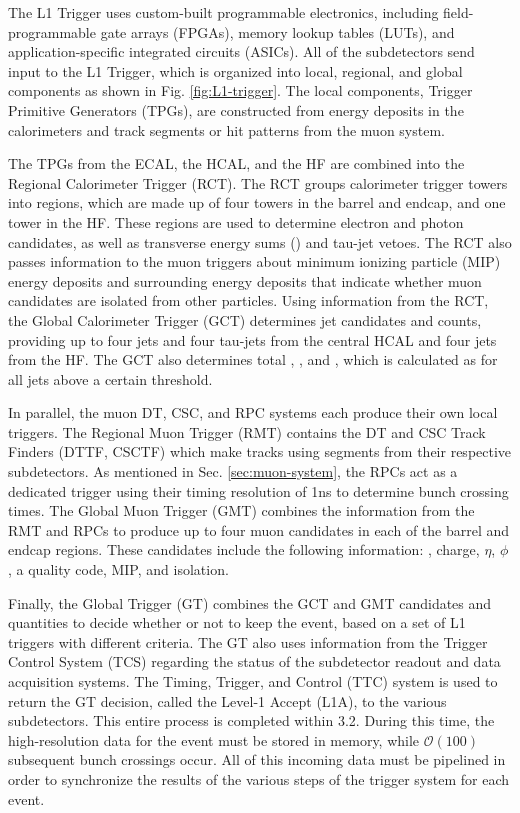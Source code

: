 The L1 Trigger uses custom-built programmable electronics, including field-programmable gate arrays (FPGAs), memory lookup tables (LUTs), and application-specific integrated circuits (ASICs). All of the subdetectors send input to the L1 Trigger, which is organized into local, regional, and global components as shown in Fig. \ref{fig:L1-trigger}. The local components, Trigger Primitive Generators (TPGs), are constructed from energy deposits in the calorimeters and track segments or hit patterns from the muon system.

The TPGs from the ECAL, the HCAL, and the HF are combined into the Regional Calorimeter Trigger (RCT). The RCT groups calorimeter trigger towers into regions, which are made up of four towers in the barrel and endcap, and one tower in the HF. These regions are used to determine electron and photon candidates, as well as transverse energy sums (\sumet) and tau-jet vetoes. The RCT also passes information to the muon triggers about minimum ionizing particle (MIP) energy deposits and surrounding energy deposits that indicate whether muon candidates are isolated from other particles. Using information from the RCT, the Global Calorimeter Trigger (GCT) determines jet candidates and counts, providing up to four jets and four tau-jets from the central HCAL and four jets from the HF. The GCT also determines total \ET, \met, and \HT, which is calculated as \sumet for all jets above a certain threshold.

In parallel, the muon DT, CSC, and RPC systems each produce their own local triggers. The Regional Muon Trigger (RMT) contains the DT and CSC Track Finders (DTTF, CSCTF) which make tracks using segments from their respective subdetectors. As mentioned in Sec. \ref{sec:muon-system}, the RPCs act as a dedicated trigger using their timing resolution of 1\unit{ns} to determine bunch crossing times. The Global Muon Trigger (GMT) combines the information from the RMT and RPCs to produce up to four muon candidates in each of the barrel and endcap regions. These candidates include the following information: \pt, charge, $\eta$, $\phi$, a quality code, MIP, and isolation.

Finally, the Global Trigger (GT) combines the GCT and GMT candidates and quantities to decide whether or not to keep the event, based on a set of L1 triggers with different criteria. The GT also uses information from the Trigger Control System (TCS) regarding the status of the subdetector readout and data acquisition systems. The Timing, Trigger, and Control (TTC) system is used to return the GT decision, called the Level-1 Accept (L1A), to the various subdetectors. This entire process is completed within 3.2\mus. During this time, the high-resolution data for the event must be stored in memory, while $\mathcal{O}(100)$ subsequent bunch crossings occur. All of this incoming data must be pipelined in order to synchronize the results of the various steps of the trigger system for each event.

